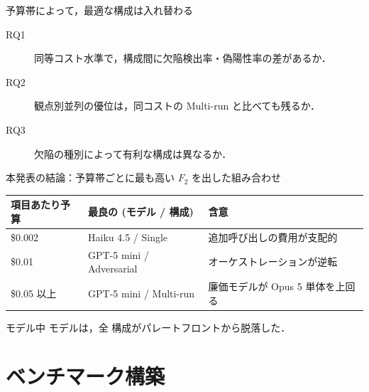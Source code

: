 \documentclass[10pt, aspectratio=169, t]{beamer}
\begin{document}
\begin{frame}{予算帯によって，最適な構成は入れ替わる}
    \begin{description}
        \item[RQ1] 同等コスト水準で，構成間に欠陥検出率・偽陽性率の差があるか．
        \item[RQ2] 観点別並列の優位は，同コストの Multi-run と比べても残るか．
        \item[RQ3] 欠陥の種別によって有利な構成は異なるか．
    \end{description}

    \vspace{10pt}
    \begin{center}
        \small 本発表の結論：予算帯ごとに最も高い $F_2$ を出した組み合わせ\\[3pt]
        \begin{tabular}{@{}lll@{}}
            \toprule
            項目あたり予算 & 最良の (モデル / 構成) & 含意 \\
            \midrule
            \$0.002 & Haiku 4.5 / Single & 追加呼び出しの費用が支配的 \\
            \$0.01 & \alert{GPT-5 mini / Adversarial} & オーケストレーションが逆転 \\
            \$0.05 以上 & \alert{GPT-5 mini / Multi-run} & 廉価モデルが Opus 5 単体を上回る \\
            \bottomrule
        \end{tabular}
    \end{center}

    \vspace{6pt}
    \nModels{} モデル中 \dominatedCount{} モデルは，全 \nConfigs{} 構成がパレートフロントから脱落した．
\end{frame}

\section{ベンチマーク構築}
\end{document}
